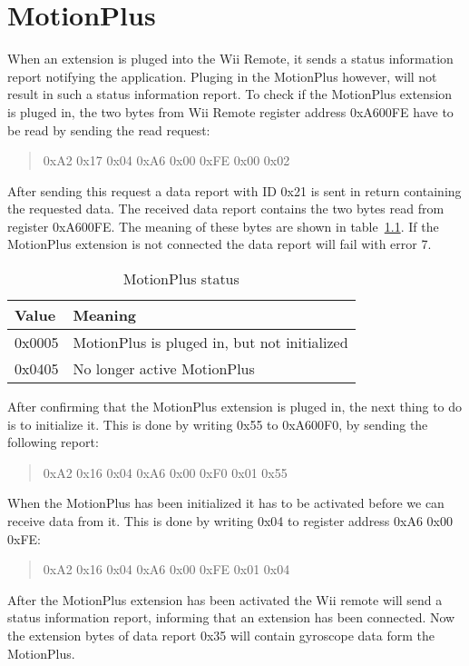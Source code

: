 \chapter{MotionPlus}
\label{app:gyroParse}
When an extension is pluged into the Wii Remote, it sends a status information report notifying the application. Pluging in the MotionPlus however, will not result in such a status information report. To check if the MotionPlus extension is pluged in, the two bytes from Wii Remote register address 0xA600FE have to be read by sending the read request:
\begin{quote}
0xA2 0x17 0x04 0xA6 0x00 0xFE 0x00 0x02
\end{quote}
After sending this request a data report with ID 0x21 is sent in return containing the requested data. The received data report contains the two bytes read from register 0xA600FE. The meaning of these bytes are shown in table~\ref{tab:motionPlusStatus}. If the MotionPlus extension is not connected the data report will fail with error 7.
\begin{table}[h!]
\begin{tabularx}{\textwidth}{|l|X|}
\hline
Value  & Meaning \\ \hline
0x0005 & MotionPlus is pluged in, but not initialized \\ \hline
0x0405 & No longer active MotionPlus\\ 
\hline
\end{tabularx}
\caption{\footnotesize MotionPlus status}
\label{tab:motionPlusStatus}
\end{table}

After confirming that the MotionPlus extension is pluged in, the next thing to do is to initialize it. This is done by writing 0x55 to 0xA600F0, by sending the following report:
\begin{quote}
0xA2 0x16 0x04 0xA6 0x00 0xF0 0x01 0x55
\end{quote}

When the MotionPlus has been initialized it has to be activated before we can receive data from it. This is done by writing 0x04 to register address 0xA6 0x00 0xFE:
\begin{quote}
0xA2 0x16 0x04 0xA6 0x00 0xFE 0x01 0x04
\end{quote}
After the MotionPlus extension has been activated the Wii remote will send a status information report, informing that an extension has been connected. Now the extension bytes of data report 0x35 will contain gyroscope data form the MotionPlus.

